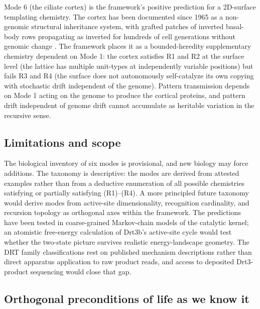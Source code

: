 \documentclass[aps,prx,reprint,amsmath,amssymb,floatfix,superscriptaddress,nofootinbib]{revtex4-2}
\theoremstyle{plain-thm}
\theoremstyle{definition-thm}
\begin{document}
Mode 6 (the ciliate cortex) is the framework's positive prediction for a 2D-surface templating chemistry. The cortex has been documented since 1965 as a non-genomic structural inheritance system, with grafted patches of inverted basal-body rows propagating as inverted for hundreds of cell generations without genomic change \citep{BeissonSonneborn1965, Frankel1989}. The framework places it as a bounded-heredity supplementary chemistry dependent on Mode 1: the cortex satisfies R1 and R2 at the surface level (the lattice has multiple unit-types at independently variable positions) but fails R3 and R4 (the surface does not autonomously self-catalyze its own copying with stochastic drift independent of the genome). Pattern transmission depends on Mode 1 acting on the genome to produce the cortical proteins, and pattern drift independent of genome drift cannot accumulate as heritable variation in the recursive sense.

\subsection{Limitations and scope}

The biological inventory of six modes is provisional, and new biology may force additions. The taxonomy is descriptive: the modes are derived from attested examples rather than from a deductive enumeration of all possible chemistries satisfying or partially satisfying (R1)--(R4). A more principled future taxonomy would derive modes from active-site dimensionality, recognition cardinality, and recursion topology as orthogonal axes within the framework. The predictions have been tested in coarse-grained Markov-chain models of the catalytic kernel; an atomistic free-energy calculation of Drt3b's active-site cycle would test whether the two-state picture survives realistic energy-landscape geometry. The DRT family classifications rest on published mechanism descriptions rather than direct apparatus application to raw product reads, and access to deposited Drt3-product sequencing would close that gap.

\subsection{Orthogonal preconditions of life as we know it}
\end{document}
